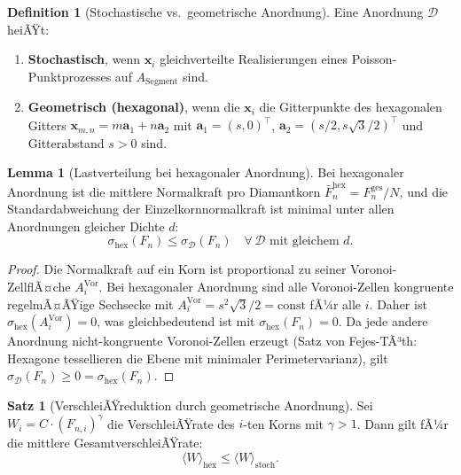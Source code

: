 ﻿\documentclass[a4paper,12pt]{article}
\theoremstyle{definition}
\newtheorem{definition}{Definition}
\newtheorem{satz}{Satz}
\newtheorem{lemma}{Lemma}
\begin{document}
\begin{definition}[Stochastische vs.\ geometrische Anordnung]
Eine Anordnung $\mathcal{D}$ heiÃŸt:
\begin{enumerate}
\item \textbf{Stochastisch}, wenn $\mathbf{x}_i$ gleichverteilte Realisierungen
      eines Poisson-Punktprozesses auf $A_{\mathrm{Segment}}$ sind.
\item \textbf{Geometrisch (hexagonal)}, wenn die $\mathbf{x}_i$ die Gitterpunkte
      des hexagonalen Gitters $\mathbf{x}_{m,n} = m\mathbf{a}_1 + n\mathbf{a}_2$
      mit $\mathbf{a}_1 = (s, 0)^\top$, $\mathbf{a}_2 = (s/2, s\sqrt{3}/2)^\top$
      und Gitterabstand $s > 0$ sind.
\end{enumerate}
\end{definition}

\begin{lemma}[Lastverteilung bei hexagonaler Anordnung]
\label{lem:hexagonal}
Bei hexagonaler Anordnung ist die mittlere Normalkraft pro Diamantkorn
$\bar{F}_n^{\mathrm{hex}} = F_n^{\mathrm{ges}} / N$, und die Standardabweichung
der Einzelkornnormalkraft ist minimal unter allen Anordnungen gleicher Dichte $d$:
\[
\sigma_{\mathrm{hex}}(F_n) \leq \sigma_{\mathcal{D}}(F_n) \quad \forall\, \mathcal{D}
\text{ mit gleichem } d.
\]
\end{lemma}

\begin{proof}
Die Normalkraft auf ein Korn ist proportional zu seiner Voronoi-ZellflÃ¤che
$A_i^{\mathrm{Vor}}$. Bei hexagonaler Anordnung sind alle Voronoi-Zellen kongruente
regelmÃ¤ÃŸige Sechsecke mit $A_i^{\mathrm{Vor}} = s^2\sqrt{3}/2 = \mathrm{const}$ fÃ¼r alle $i$.
Daher ist $\sigma_{\mathrm{hex}}(A_i^{\mathrm{Vor}}) = 0$, was gleichbedeutend ist mit
$\sigma_{\mathrm{hex}}(F_n) = 0$. Da jede andere Anordnung nicht-kongruente Voronoi-Zellen
erzeugt (Satz von Fejes-TÃ³th: Hexagone tessellieren die Ebene mit minimaler Perimetervarianz),
gilt $\sigma_{\mathcal{D}}(F_n) \geq 0 = \sigma_{\mathrm{hex}}(F_n)$.
\end{proof}

\begin{satz}[VerschleiÃŸreduktion durch geometrische Anordnung]
\label{satz:verschleiss}
Sei $W_i = C \cdot (F_{n,i})^{\gamma}$ die VerschleiÃŸrate des $i$-ten Korns mit $\gamma > 1$.
Dann gilt fÃ¼r die mittlere GesamtverschleiÃŸrate:
\[
\langle W \rangle_{\mathrm{hex}} \leq \langle W \rangle_{\mathrm{stoch}}.
\]
\end{satz}
\end{document}
